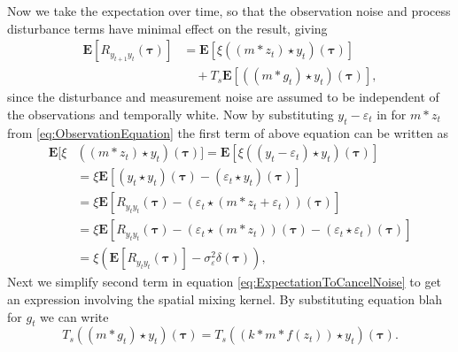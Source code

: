\documentclass[10pt,twocolumn,twoside]{IEEEtran}
\begin{document}
Now we take the expectation over time, so that the observation noise and process disturbance terms have minimal effect on the result, giving 
\begin{align}\label{eq:ExpectationToCancelNoise}
	\mathbf{E}[R_{y_{t+1}y_t}(\boldsymbol{\tau})] &= \mathbf{E}[\xi\left(\left(m \ast z_t\right) \star y_t \right)(\boldsymbol{\tau})] \nonumber \\
	 &\quad+ T_s \mathbf{E}[\left(\left(m\ast g_t\right)\star y_t \right)(\boldsymbol{\tau})],
\end{align}
since the disturbance and measurement noise are assumed to be independent of the observations and temporally white. Now by substituting $y_t - \varepsilon_t$   in for $m\ast z_t$ from \eqref{eq:ObservationEquation} the first term of above equation can be written as
\begin{align}
	\mathbf{E}[\xi&\left(\left(m \ast z_t \right) \star y_t \right)(\boldsymbol{\tau})] = \mathbf{E}\left[\xi\left(\left(y_t-\varepsilon_t\right) \star y_t \right)(\boldsymbol{\tau})\right] \nonumber \\
	&= \xi \mathbf{E}\left[ (y_t \star y_t)(\boldsymbol{\tau}) - \left(\varepsilon_t\star y_t \right)(\boldsymbol{\tau})\right] \nonumber \\
	&= \xi\mathbf{E}[ R_{y_ty_t}(\boldsymbol{\tau})  - \left(\varepsilon_t \star (m\ast z_t + \varepsilon_t)\right) (\boldsymbol{\tau})] \nonumber \\
	&=\xi\mathbf{E}[ R_{y_ty_t}(\boldsymbol{\tau}) -\left(\varepsilon_t\star (m\ast z_t)\right)(\boldsymbol{\tau}) - (\varepsilon_t\star\varepsilon_t)(\boldsymbol{\tau})] \nonumber\\ 
	&= \xi\left(\mathbf{E}[ R_{y_ty_t}(\boldsymbol{\tau})] - \sigma_{\varepsilon}^2 \delta(\boldsymbol{\tau})\right), \label{eq:FirstTermReduced}
\end{align}
Next we simplify second term in equation \eqref{eq:ExpectationToCancelNoise} to get an expression involving the spatial mixing kernel. By substituting equation blah for $g_t$ we can write
\begin{equation}\label{eq:before_linearization}
	T_s((m \ast g_t) \star y_t)(\boldsymbol\tau) = T_s((k \ast m\ast f(z_t)) \star y_t)(\boldsymbol\tau).
\end{equation}   
\end{document}
